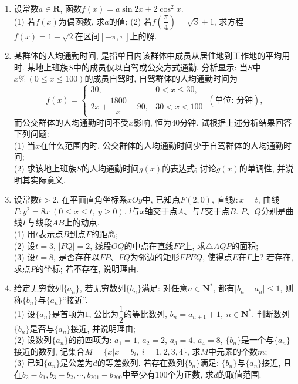 \documentclass[10pt,a4paper]{article}
\begin{document}
\begin{enumerate}[1.]
\begin{center}
\begin{tikzpicture}
    \end{tikzpicture}
\end{center}
\item 设常数$a\in \mathbf{R}$, 函数$f(x)=a\sin 2x+2 \cos^2 x$.\\
(1) 若$f(x)$为偶函数, 求$a$的值;
(2) 若$f\left(\dfrac{\pi}{4}\right)=\sqrt{3}+1$, 求方程$f(x)=1-\sqrt{2}$在区间$[-\pi,\pi]$上的解.
\item 某群体的人均通勤时间, 是指单日内该群体中成员从居住地到工作地的平均用时. 某地上班族$S$中的成员仅以自驾或公交方式通勤. 分析显示: 当$S$中$x\% \ (0\le x \le 100)$的成员自驾时, 自驾群体的人均通勤时间为
$$f(x)=\begin{cases}
30, & 0<x \le 30,\\ 2x+\dfrac{1800}{x}-90, & 30<x<100\end{cases} \ (\text{单位: 分钟}),$$
而公交群体的人均通勤时间不受$x$影响, 恒为$40$分钟. 试根据上述分析结果回答下列问题:\\
(1) 当$x$在什么范围内时, 公交群体的人均通勤时间少于自驾群体的人均通勤时间;\\
(2) 求该地上班族$S$的人均通勤时间$g(x)$的表达式; 讨论$g(x)$的单调性, 并说明其实际意义.
\item 设常数$t>2$. 在平面直角坐标系$xOy$中, 已知点$F(2,0)$, 直线$l:x=t$, 曲线$\Gamma:y^2=8x \ (0\le x\le t, \ y\ge 0)$. $l$与$x$轴交于点$A$、与$\Gamma$交于点$B$. $P$、$Q$分别是曲线$\Gamma$与线段$AB$上的动点.\\
(1) 用$t$表示点$B$到点$F$的距离;\\
(2) 设$t=3$, $|FQ|=2$, 线段$OQ$的中点在直线$FP$上, 求$\triangle AQP$的面积;\\
(3) 设$t=8$, 是否存在以$FP$、$FQ$为邻边的矩形$FPEQ$, 使得点$E$在$\Gamma$上? 若存在, 求点$P$的坐标; 若不存在, 说明理由.
\item 给定无穷数列$\{a_n\}$, 若无穷数列$\{b_n\}$满足: 对任意$n\in \mathbf{N}^*$, 都有$|b_n-a_n|\le 1$, 则称$\{b_n\}$与$\{a_n\}$``接近''.\\
(1) 设$\{a_n\}$是首项为$1$, 公比为$\dfrac{1}{2}$的等比数列, $b_n=a_{n+1}+1, \ n\in \mathbf{N}^*$. 判断数列$\{b_n\}$是否与$\{a_n\}$接近, 并说明理由;\\
(2) 设数列$\{a_n\}$的前四项为: $a_1=1$, $a_2=2$, $a_3=4$, $a_4=8$, $\{b_n\}$是一个与$\{a_n\}$接近的数列, 记集合$M=\{x|x=b_i, \ i=1,2,3,4\}$, 求$M$中元素的个数$m$;\\
(3) 已知$\{a_n\}$是公差为$d$的等差数列. 若存在数列$\{b_n\}$满足: $\{b_n\}$与$\{a_n\}$接近, 且在$b_2-b_1,b_3-b_2,\cdots,b_{201}-b_{200}$中至少有$100$个为正数, 求$d$的取值范围.
\end{enumerate}
\end{document}
